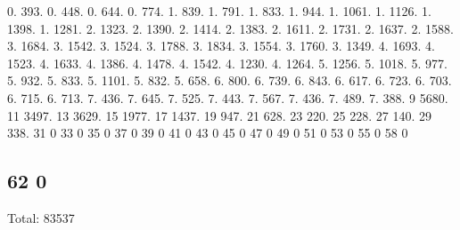 0. 393. 0. 448. 0. 644. 0. 774. 1. 839. 1. 791. 1. 833. 1. 944. 1. 1061. 1. 1126. 1. 1398. 1. 1281. 2. 1323. 2. 1390. 2. 1414. 2. 1383. 2. 1611. 2. 1731. 2. 1637. 2. 1588. 3. 1684. 3. 1542. 3. 1524. 3. 1788. 3. 1834. 3. 1554. 3. 1760. 3. 1349. 4. 1693. 4. 1523. 4. 1633. 4. 1386. 4. 1478. 4. 1542. 4. 1230. 4. 1264. 5. 1256. 5. 1018. 5. 977. 5. 932. 5. 833. 5. 1101. 5. 832. 5. 658. 6. 800. 6. 739. 6. 843. 6. 617. 6. 723. 6. 703. 6. 715. 6. 713. 7. 436. 7. 645. 7. 525. 7. 443. 7. 567. 7. 436. 7. 489. 7. 388. 9 5680. 11 3497. 13 3629. 15 1977. 17 1437. 19 947. 21 628. 23 220. 25 228. 27 140. 29 338. 31 0 33 0 35 0 37 0 39 0 41 0 43 0 45 0 47 0 49 0 51 0 53 0 55 0 58 0 \subsection*{62 0 }

Total\+: 83537 